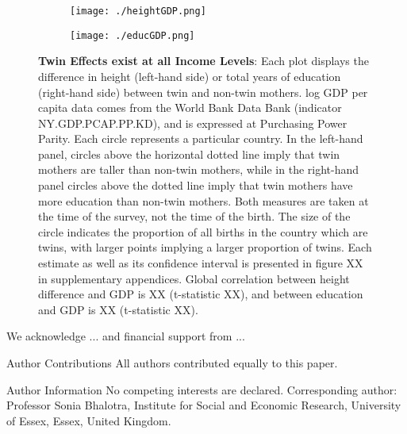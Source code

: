 \documentclass{nature}
\begin{document}
\begin{linenumbers}
\begin{spacing}{1}
\begin{figure}[htpb!]
\begin{subfigure}{.5\textwidth}
  \texttt{[image: ./heightGDP.png]}
\end{subfigure}%
\begin{subfigure}{.5\textwidth}
  \texttt{[image: ./educGDP.png]}
\end{subfigure}
\caption{\textbf{Twin Effects exist at all Income Levels}: Each plot displays the difference in height (left-hand side) or total years of education (right-hand side) between twin and non-twin mothers.  log GDP per capita data comes from the World Bank Data Bank (indicator NY.GDP.PCAP.PP.KD), and is expressed at Purchasing Power Parity.  Each circle represents a particular country.  In the left-hand panel, circles above the horizontal dotted line imply that twin mothers are taller than non-twin mothers, while in the right-hand panel circles above the dotted line imply that twin mothers have more education than non-twin mothers.  Both measures are taken at the time of the survey, not the time of the birth.  The size of the circle indicates the proportion of all births in the country which are twins, with larger points implying a larger proportion of twins. Each estimate as well as its confidence interval is presented in figure XX in supplementary appendices.  Global correlation between height difference and GDP is XX (t-statistic XX), and between education and GDP is XX (t-statistic XX).}
\end{figure}
\end{spacing}

\clearpage


\clearpage
\begin{addendum}
 \item We acknowledge ...  and financial support from ...
 \item[Author Contributions] All authors contributed equally to this paper.
 \item[Author Information] No competing interests are declared.  Corresponding author: Professor Sonia Bhalotra, Institute for Social and Economic Research, University of Essex, Essex, United Kingdom.
\end{addendum}

\end{linenumbers}
\end{document}
